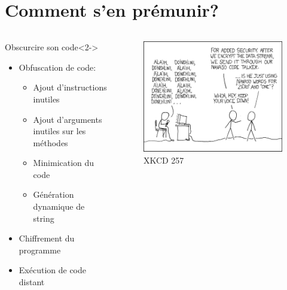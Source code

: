 \documentclass[aspectratio=1610]{beamer}%
\begin{document}
 

\section{Comment s'en prémunir?}
\begin{frame}
  \begin{columns}
    \begin{column}[t]{0.48\linewidth}
      \centering
      \begin{block}{Obscurcire son code}<2->
        \begin{itemize}
          \item<3-> Obfuscation de code:
          \begin{itemize}
          \item<4-> Ajout d'instructions inutiles
          \item<5-> Ajout d'arguments inutiles sur les méthodes
          \item<6-> Minimication du code
          \item<7-> Génération dynamique de string
          \end{itemize}
          \item<8-> Chiffrement du programme
          \item<9-> Exécution de code distant
          \end{itemize}
      \end{block}
    \end{column}
    \begin{column}[t]{0.48\linewidth}
      \centering
        \begin{figure}
          \includegraphics[width=\linewidth]{obscurity.png}
          \caption{XKCD 257}
        \end{figure}
    \end{column}
  \end{columns}
  \end{frame}
\end{document}
